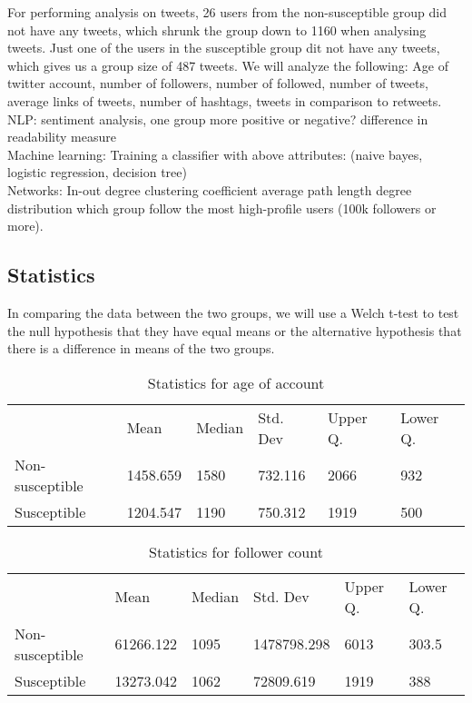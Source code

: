 \documentclass[10pt]{IEEEtran}
\begin{document}
For performing analysis on tweets, 26 users from the non-susceptible group did not have any tweets, which shrunk the group down to 1160 when analysing tweets. Just one of the users in the susceptible group dit not have any tweets, which gives us a group size of 487 tweets.
We will analyze the following: Age of twitter account, number of followers, number of followed, number of tweets, average links of tweets, number of hashtags, tweets in comparison to retweets.
\\
NLP:
sentiment analysis, one group more positive or negative?
difference in readability measure
\\
Machine learning:
Training a classifier with above attributes: (naive bayes, logistic regression, decision tree)
\\
Networks:
In-out degree
clustering coefficient
average path length
degree distribution
which group follow the most high-profile users (100k followers or more).

\subsection{Statistics}
In comparing the data between the two groups, we will use a Welch t-test to test the null hypothesis that they have equal means or the alternative hypothesis that there is a difference in means of the two groups.

\begin{table}[ht]
\begin{tabular}{llllll}
\textbf{}       & Mean     & Median & Std. Dev & Upper Q. & Lower Q. \\
Non-susceptible & 1458.659 & 1580   & 732.116  & 2066     & 932      \\
Susceptible     & 1204.547 & 1190   & 750.312  & 1919     & 500     
\end{tabular}
\caption{Statistics for age of account}
\end{table}

\begin{table}[ht]
\begin{tabular}{llllll}
\textbf{}       & Mean      & Median & Std. Dev    & Upper Q. & Lower Q. \\
Non-susceptible & 61266.122 & 1095   & 1478798.298 & 6013     & 303.5    \\
Susceptible     & 13273.042 & 1062   & 72809.619   & 1919     & 388     
\end{tabular}
\caption{Statistics for follower count}
\end{table}
\end{document}
